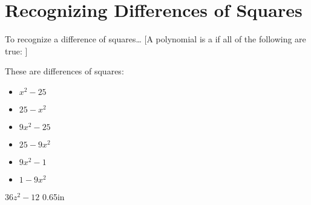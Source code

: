 \section{Recognizing Differences of Squares}

\begin{myConceptSteps}{To recognize a difference of squares\dots}
    [A polynomial is a    
    if all of the following are true:
    ]
\end{myConceptSteps}

These are differences of squares:

{
    \normalsize
    \hfill
    \begin{minipage}{0.25\textwidth}
        \begin{itemize}[nosep]
            \item $x^2 - 25$
            \item $25 - x^2$
        \end{itemize}
    \end{minipage}
    \hfill
    \begin{minipage}{0.25\textwidth}
        \begin{itemize}[nosep]
            \item $9x^2 - 25$ 
            \item $25 - 9x^2$
        \end{itemize}
    \end{minipage}
    \hfill
    \begin{minipage}{0.25\textwidth}
        \begin{itemize}[nosep]
            \item $9x^2 - 1$
            \item $1 - 9x^2$
        \end{itemize}
    \end{minipage}
    \hfill{}
}

{
    \centering $ 36z^2 - 12$
}
{0.65in}